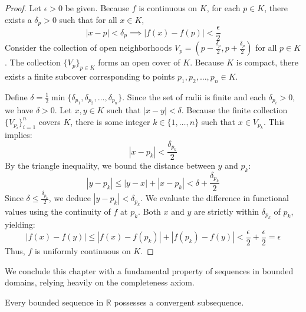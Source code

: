 \begin{proof}
Let $\epsilon > 0$ be given. Because $f$ is continuous on $K$, for each $p \in K$, there exists a $\delta_p > 0$ such that for all $x \in K$,
\[
|x - p| < \delta_p \implies |f(x) - f(p)| < \frac{\epsilon}{2}
\]
Consider the collection of open neighborhoods $V_p = (p - \frac{\delta_p}{2}, p + \frac{\delta_p}{2})$ for all $p \in K$. The collection $\{V_p\}_{p \in K}$ forms an open cover of $K$. Because $K$ is compact, there exists a finite subcover corresponding to points $p_1, p_2, \dots, p_n \in K$. 

Define $\delta = \frac{1}{2} \min\{\delta_{p_1}, \delta_{p_2}, \dots, \delta_{p_n}\}$. Since the set of radii is finite and each $\delta_{p_i} > 0$, we have $\delta > 0$. Let $x, y \in K$ such that $|x - y| < \delta$. Because the finite collection $\{V_{p_i}\}_{i=1}^n$ covers $K$, there is some integer $k \in \{1, \dots, n\}$ such that $x \in V_{p_k}$. This implies:
\[
|x - p_k| < \frac{\delta_{p_k}}{2}
\]
By the triangle inequality, we bound the distance between $y$ and $p_k$:
\[
|y - p_k| \le |y - x| + |x - p_k| < \delta + \frac{\delta_{p_k}}{2}
\]
Since $\delta \le \frac{\delta_{p_k}}{2}$, we deduce $|y - p_k| < \delta_{p_k}$. We evaluate the difference in functional values using the continuity of $f$ at $p_k$. Both $x$ and $y$ are strictly within $\delta_{p_k}$ of $p_k$, yielding:
\[
|f(x) - f(y)| \le |f(x) - f(p_k)| + |f(p_k) - f(y)| < \frac{\epsilon}{2} + \frac{\epsilon}{2} = \epsilon
\]
Thus, $f$ is uniformly continuous on $K$.
\end{proof}

We conclude this chapter with a fundamental property of sequences in bounded domains, relying heavily on the completeness axiom.

\begin{theorem}
Every bounded sequence in $\mathbb{R}$ possesses a convergent subsequence.
\end{theorem}

